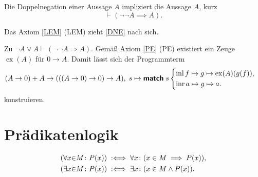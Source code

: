 \begin{Axiom}\label{DNE}\newlinefirst
Die Doppelnegation einer Aussage $A$ impliziert die Aussage $A$, kurz
\[\vdash (\neg\neg A\implies A).\]
\end{Axiom}

\begin{Satz} Das Axiom \ref{LEM} (LEM) zieht \ref{DNE} nach sich.
\end{Satz}
\begin{Beweis}
Zu $\neg A \lor A\vdash (\neg\neg A \Rightarrow A)$.
Gemäß Axiom \ref{PE} (PE) existiert ein Zeuge $\operatorname{ex}(A)$
für $0\to A$. Damit lässt sich der Programmterm
\[(A\to 0) + A \to (((A\to 0)\to 0)\to A),\;
s\mapsto\text{{\normalfont\sffamily\bfseries match}}\; s\begin{cases}
\operatorname{inl} f\mapsto g\mapsto \operatorname{ex}(A)(g(f)),\\
\operatorname{inr} a\mapsto g\mapsto a.
\end{cases}\]
konstruieren.\;\qedsymbol
\end{Beweis}

\section{Prädikatenlogik}

\begin{Definition}%
\label{def:bounded}
\begin{align}
(\forall x{\in}M\colon P(x)) &\;:\Longleftrightarrow\; \forall x\colon (x\in M\implies P(x)),\\
(\exists x{\in}M\colon P(x)) &\;:\Longleftrightarrow\; \exists x\colon (x\in M\land P(x)).
\end{align}
\end{Definition}

